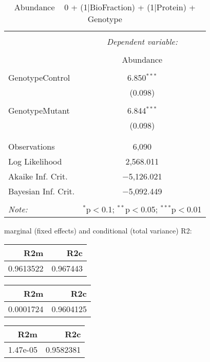\documentclass[11pt]{report}
\begin{document}
\begin{table}[!htbp] \centering 
  \caption{Abundance ~ 0 + (1|BioFraction) + (1|Protein) + Genotype} 
  \label{} 
\begin{tabular}{@{\extracolsep{5pt}}lc} 
\\[-1.8ex]\hline 
\hline \\[-1.8ex] 
 & \multicolumn{1}{c}{\textit{Dependent variable:}} \\ 
\cline{2-2} 
\\[-1.8ex] & Abundance \\ 
\hline \\[-1.8ex] 
 GenotypeControl & 6.850$^{***}$ \\ 
  & (0.098) \\ 
  & \\ 
 GenotypeMutant & 6.844$^{***}$ \\ 
  & (0.098) \\ 
  & \\ 
\hline \\[-1.8ex] 
Observations & 6,090 \\ 
Log Likelihood & 2,568.011 \\ 
Akaike Inf. Crit. & $-$5,126.021 \\ 
Bayesian Inf. Crit. & $-$5,092.449 \\ 
\hline 
\hline \\[-1.8ex] 
\textit{Note:}  & \multicolumn{1}{r}{$^{*}$p$<$0.1; $^{**}$p$<$0.05; $^{***}$p$<$0.01} \\ 
\end{tabular} 
\end{table} 
marginal (fixed effects) and conditional (total variance) R2:

\begin{tabular}{r|r}
\hline
R2m & R2c\\
\hline
0.9613522 & 0.967443\\
\hline
\end{tabular}

\begin{tabular}{r|r}
\hline
R2m & R2c\\
\hline
0.0001724 & 0.9604125\\
\hline
\end{tabular}

\begin{tabular}{r|r}
\hline
R2m & R2c\\
\hline
1.47e-05 & 0.9582381\\
\hline
\end{tabular}
\end{document}
